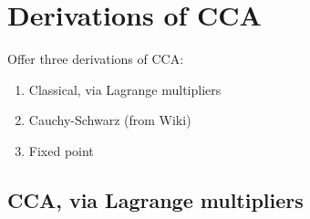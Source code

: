 \documentclass[12pt]{article}
\begin{document}
\section{ Derivations of CCA }
\label{sec:derive}

Offer three derivations of CCA:
\begin{enumerate}
  \item Classical, via Lagrange multipliers
  \item Cauchy-Schwarz (from Wiki)
  \item Fixed point
\end{enumerate}


\subsection{CCA, via Lagrange multipliers}
\end{document}
